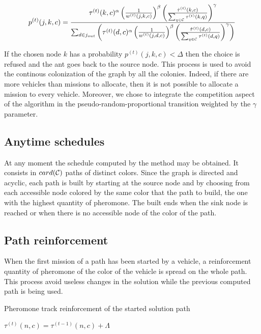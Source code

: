\documentclass[a4paper,10pt]{article}
\begin{document}
\begin{equation*}
  p^{(t)}(j,k,c) = \frac
    {
      \tau^{(t)}(k,c)^{\alpha}
      \left( \frac{1}{w^{(t)}(j,k,c)} \right) ^{\beta}
      \left( \frac{\hat \tau^{(t)}(k,c)}{\sum_{q \in \cal{C}} \tau^{(t)}(k,q)} \right)^{\gamma}
    }
    {
      \sum_{d \in j_{out}} \left(
	\tau^{(t)}(d,c)^{\alpha}
	\left( \frac{1}{w^{(t)}(j,d,c)} \right)^{\beta}
	\left( \frac{\hat \tau^{(t)}(d,c)}{\sum_{q \in \cal{C}} \tau^{(t)}(d,q)} \right)^{\gamma}
      \right)
    }
\end{equation*}

If the chosen node $k$ has a probability $p^{(t)}(j,k,c) < \Delta$ then the choice is refused and the ant goes back to the source node. This process is used to avoid the continous colonization of the graph by all the colonies. Indeed, if there are more vehicles than missions to allocate, then it is not possible to allocate a mission to every vehicle. Moreover, we chose to integrate the competition aspect of the algorithm in the pseudo-random-proportional transition weighted by the $\gamma$ parameter.

\subsection{Anytime schedules}
At any moment the schedule computed by the method may be obtained. It consists in $card(\cal{C})$ paths of distinct colors. Since the graph is directed and acyclic, each path is built by starting at the source node and by choosing from each accessible node colored by the same color that the path to build, the one with the highest quantity of pheromone. The built ends when the sink node is reached or when there is no accessible node of the color of the path.

\subsection{Path reinforcement}
When the first mission of a path has been started by a vehicle, a reinforcement quantity of pheromone of the color of the vehicle is spread on the whole path. This process avoid useless changes in the solution while the previous computed path is being used.


\begin{algorithm}
\caption{Pheromone track reinforcement of the started solution path}
\begin{algorithmic} 
\label{algoReinforcement}
\STATE $\tau^{(t)}(n,c) =  \tau^{(t-1)}(n,c) + \Lambda$
\ENDFOR
\end{algorithmic}
\end{algorithm}
\end{document}
